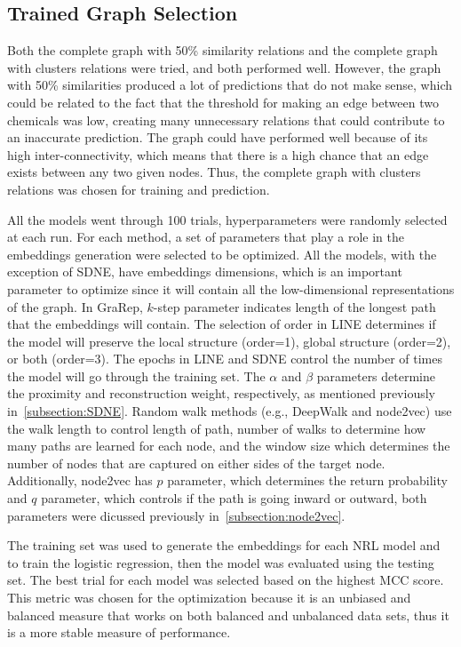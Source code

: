 \subsection{Trained Graph Selection}

Both the complete graph with 50\% similarity relations and the complete graph with clusters relations were tried, and both performed well.
However, the graph with 50\% similarities produced a lot of predictions that do not make sense, which could be related to the fact that the threshold for making an edge between two chemicals was low, creating many unnecessary relations that could contribute to an inaccurate prediction.
The graph could have performed well because of its high inter-connectivity, which means that there is a high chance that an edge exists between any two given nodes.
Thus, the complete graph with clusters relations was chosen for training and prediction.

All the models went through 100 trials, hyperparameters were randomly selected at each run.
For each method, a set of parameters that play a role in the embeddings generation were selected to be optimized.
All the models, with the exception of SDNE, have embeddings dimensions, which is an important parameter to optimize since it will contain all the low-dimensional representations of the graph.
In GraRep, $k$-step parameter indicates length of the longest path that the embeddings will contain.
The selection of order in \ac{LINE} determines if the model will preserve the local structure (order=1), global structure (order=2), or both (order=3).
The epochs in \ac{LINE} and \ac{SDNE} control the number of times the model will go through the training set.
The $\alpha$ and $\beta$ parameters determine the proximity and reconstruction weight, respectively, as mentioned previously in~\ref{subsection:SDNE}.
Random walk methods (e.g., DeepWalk and node2vec) use the walk length to control length of path, number of walks to determine how many paths are learned for each node, and the window size which determines the number of nodes that are captured on either sides of the target node.
Additionally, node2vec has $p$ parameter, which determines the return probability and $q$ parameter, which controls if the path is going inward or outward, both parameters were dicussed previously in~\ref{subsection:node2vec}.

The training set was used to generate the embeddings for each \ac{NRL} model and to train the logistic regression, then the model was evaluated using the testing set.
The best trial for each model was selected based on the highest \ac{MCC} score.
This metric was chosen for the optimization because it is an unbiased and balanced measure that works on both balanced and unbalanced data sets, thus it is a more stable measure of performance.

